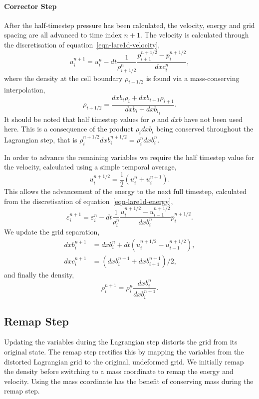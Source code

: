 \paragraph{Corrector Step}
\label{sec-corrector-step}
After the half-timestep pressure has been calculated, the velocity, energy and grid spacing are all advanced to time index $n+1$. The velocity is calculated through the discretisation of equation~\eqref{eqn-lare1d-velocity},
\begin{equation}
  u_i^{n+1} = u_i^n - dt \frac{1}{\rho^n_{i+1/2}}\frac{p^{n+1/2}_{i+1} - p^{n+1/2}_i}{dxc_i^n},
  \label{}
\end{equation}
where the density at the cell boundary $\rho_{i+1/2}$ is found via a mass-conserving interpolation,
\begin{equation}
  \rho_{i+1/2} = \frac{dxb_i \rho_i + dxb_{i+1}\rho_{i+1}}{dxb_i + dxb_{i_1}}.
  \label{eqn-lagrangian-density-interpolation}
\end{equation}
It should be noted that half timestep values for $\rho$ and $dxb$ have not been used here. This is a consequence of the product $\rho_i dxb_i$ being conserved throughout the Lagrangian step, that is $\rho_i^{n+1/2} dxb_i^{n+1/2} = \rho_i^n dxb_i^n$.

In order to advance the remaining variables we require the half timestep value for the velocity, calculated using a simple temporal average,
\begin{equation}
  u_i^{n+1/2} = \frac{1}{2}(u_i^{n} + u_i^{n+1}).
  \label{}
\end{equation}
This allows the advancement of the energy to the next full timestep, calculated from the discretisation of equation~\eqref{eqn-lare1d-energy},
\begin{equation}
  \varepsilon_i^{n+1} = \varepsilon_i^{n} - dt \frac{1}{\rho_i^n} \frac{u_i^{n+1/2} - u_{i-1}^{n+1/2}}{ dxb_i^n}p_i^{n+1/2}.
  \label{}
\end{equation}
We update the grid separation,
\begin{align}
  dxb_i^{n+1} &=  dxb_i^n + dt(u_i^{n+1/2} - u_{i-1}^{n+1/2}),\\
  dxc_i^{n+1} &=  (dxb_i^{n+1} + dxb_{i+1}^{n+1})/2,
  \label{eqn-lagrangian-grid-update}
\end{align}
and finally the density,
\begin{equation}
  \rho_i^{n+1} = \rho_i^n \frac{dxb_i^n}{dxb_i^{n+1}}.
  \label{}
\end{equation}

\subsection{Remap Step}
Updating the variables during the Lagrangian step distorts the grid from its original state. The remap step rectifies this by mapping the variables from the distorted Lagrangian grid to the original, undeformed grid. We initially remap the density before switching to a mass coordinate to remap the energy and velocity. Using the mass coordinate has the benefit of conserving mass during the remap step.


